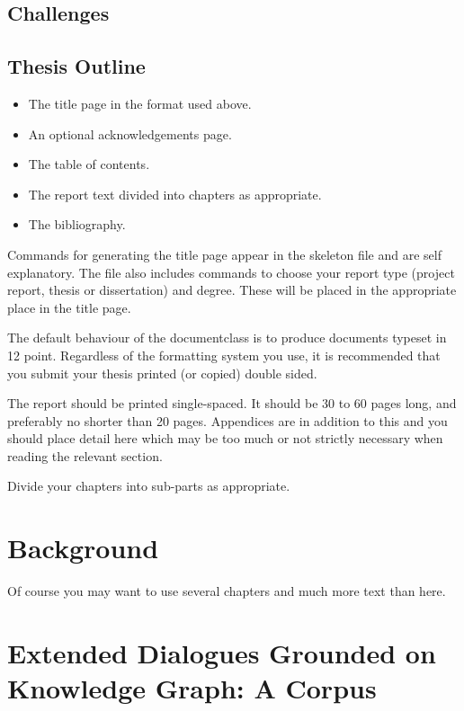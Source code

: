 \documentclass[bsc,frontabs,twoside,singlespacing,parskip,deptreport]{infthesis}     %
\begin{document}
\section {Challenges}



\section {Thesis Outline}

\begin{itemize}
\item
The title page  in the format used above.
\item
An optional acknowledgements page.
\item
The table of contents.
\item
The report text divided into chapters as appropriate.
\item
The bibliography.
\end{itemize}

Commands for generating the title page appear in the skeleton file and
are self explanatory.
The file also includes commands to choose your report type (project
report, thesis or dissertation) and degree.
These will be placed in the appropriate place in the title page. 

The default behaviour of the documentclass is to produce documents typeset in
12 point.  Regardless of the formatting system you use, 
it is recommended that you submit your thesis printed (or copied) 
double sided.

The report should be printed single-spaced.
It should be 30 to 60 pages long, and preferably no shorter than 20 pages.
Appendices are in addition to this and you should place detail
here which may be too much or not strictly necessary when reading the relevant section.


Divide your chapters into sub-parts as appropriate.








\chapter{Background}

Of course
you may want to use several chapters and much more text than here.

\chapter{Extended Dialogues Grounded on Knowledge Graph: A Corpus}
\end{document}
